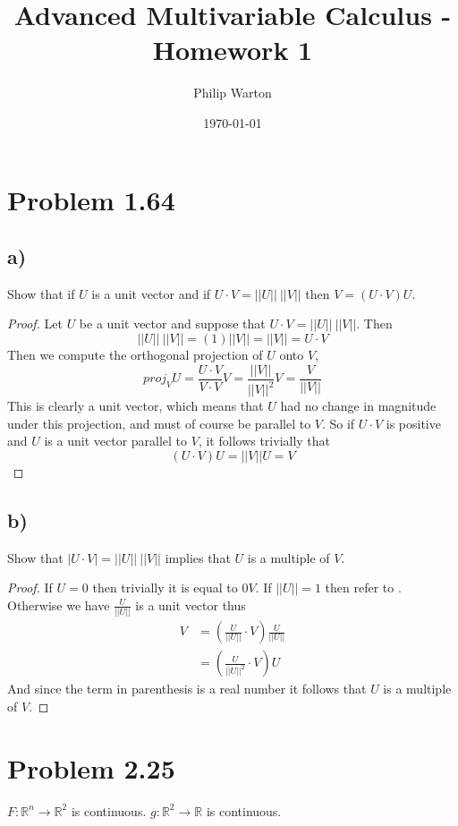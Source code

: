 \documentclass{article}
\theoremstyle{definition}
\begin{document}
\title{Advanced Multivariable Calculus - Homework 1}
\author{Philip Warton}
\date{\today}
\maketitle
\section*{Problem 1.64}
\subsection*{a)}
\begin{mdframed}[]
    Show that if $U$ is a unit vector and if $U \cdot V = ||U|| \ ||V||$ then $V = (U \cdot V) U$.
\end{mdframed}
\begin{proof}
    Let $U$ be a unit vector and suppose that $U \cdot V = ||U|| \ ||V||$. Then
    \[
        ||U|| \ ||V|| = (1)||V|| = ||V|| = U \cdot V
    \]
    Then we compute the orthogonal projection of $U$ onto $V$,
    \[
        proj_VU = \frac{U \cdot V}{V \cdot V}V = \frac{||V||}{||V||^2}V = \frac{V}{||V||}
    \]
    This is clearly a unit vector, which means that $U$ had no change in magnitude under this 
    projection, and must of course be parallel to $V$. So if $U \cdot V$ is positive and $U$ is a unit vector parallel to $V$,
    it follows trivially that
    \[
        (U \cdot V)U = ||V||U = V
    \]
\end{proof}
\subsection*{b)}
\begin{mdframed}[]
    Show that $|U \cdot V| = ||U|| \ ||V||$ implies that $U$ is a multiple of $V$.
\end{mdframed}
\begin{proof}
    If $U = 0$ then trivially it is equal to $0V$. If $||U|| = 1$ then refer to . Otherwise we have $\frac{U}{||U||}$ is a unit vector thus
    \begin{align*}
        V &= \left(\frac{U}{||U||} \cdot V\right) \frac{U}{||U||} \\
        &= \left(\frac{U}{||U||^2} \cdot V\right) U
    \end{align*}
    And since the term in parenthesis is a real number it follows that $U$ is a multiple of $V$.
\end{proof}
\section*{Problem 2.25}
$F:\mathbb{R}^n \rightarrow\mathbb{R}^2$ is continuous. $g:\mathbb{R}^2 \rightarrow \mathbb{R}$ is continuous.
\end{document}
